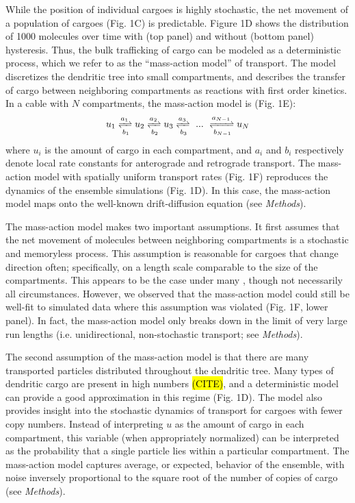 \documentclass[11pt]{wlpeerj}
\begin{document}
While the position of individual cargoes is highly stochastic, the net movement of a population of cargoes (Fig. 1C) is predictable.
Figure 1D shows the distribution of 1000 molecules over time with (top panel) and without (bottom panel) hysteresis.
Thus, the bulk trafficking of cargo can be modeled as a deterministic process, which we refer to as the ``mass-action model'' of transport. The model discretizes the dendritic tree into small compartments, and describes the transfer of cargo between neighboring compartments as reactions with first order kinetics. In a cable with $N$ compartments, the mass-action model is (Fig. 1E):
\begin{equation}
u_1 \xrightleftharpoons[b_1]{a_1} u_2 \xrightleftharpoons[b_2]{a_2} u_3 \xrightleftharpoons[b_3]{a_3} ~...~ \xrightleftharpoons[b_{N-1}]{a_{N-1}} u_N
\end{equation}
where $u_i$ is the amount of cargo in each compartment, and $a_i$ and $b_i$ respectively denote local rate constants for anterograde and retrograde transport. The mass-action model with spatially uniform transport rates (Fig. 1F) reproduces the dynamics of the ensemble simulations (Fig. 1D). In this case, the mass-action model maps onto the well-known drift-diffusion equation (see \textit{Methods}).

The mass-action model makes two important assumptions. It first assumes that the net movement of molecules between neighboring compartments is a stochastic and memoryless process. This assumption is reasonable for cargoes that change direction often; specifically, on a length scale comparable to the size of the compartments. This appears to be the case under many \citep{Muller_2008,Verbrugge_2009}, though not necessarily all \citep{Dynes_2007,Soundararajan_2014} circumstances. However, we observed that the mass-action model could still be well-fit to simulated data where this assumption was violated (Fig. 1F, lower panel). In fact, the mass-action model only breaks down in the limit of very large run lengths (i.e. unidirectional, non-stochastic transport; see \textit{Methods}).

The second assumption of the mass-action model is that there are many transported particles distributed throughout the dendritic tree. Many types of dendritic cargo are present in high numbers \hl{(CITE)}, and a deterministic model can provide a good approximation in this regime (Fig. 1D). The model also provides insight into the stochastic dynamics of transport for cargoes with fewer copy numbers. Instead of interpreting $u$ as the amount of cargo in each compartment, this variable (when appropriately normalized) can be interpreted as the probability that a single particle lies within a particular compartment. The mass-action model captures average, or expected, behavior of the ensemble, with noise inversely proportional to the square root of the number of copies of cargo (see \textit{Methods}). 
\end{document}
